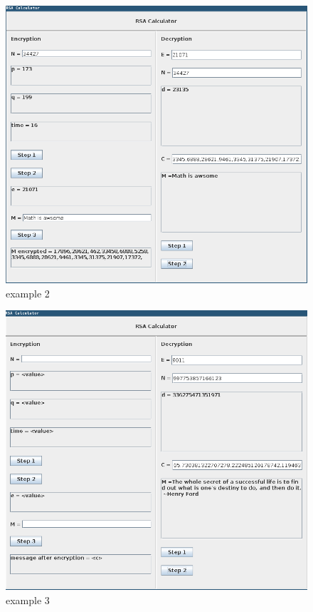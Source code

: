 \begin{figure}[h]
    \includegraphics[width=\linewidth]{images/example_2}
    \caption{example 2}
    \label{fig:example 2}
\end{figure}

\begin{figure}[h]
    \includegraphics[width=\linewidth]{images/example_3}
    \caption{example 3}
    \label{fig:example 3}
\end{figure}
